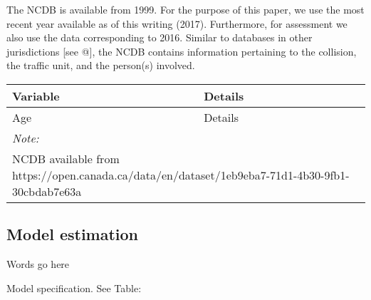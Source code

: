 \documentclass[]{elsarticle} %
\begin{document}
The NCDB is available from 1999. For the purpose of this paper, we use
the most recent year available as of this writing (2017). Furthermore,
for assessment we also use the data corresponding to 2016. Similar to
databases in other jurisdictions {[}see @{]}, the NCDB contains
information pertaining to the collision, the traffic unit, and the
person(s) involved.

\begin{tabular}{ll}
\toprule
Variable & Details\\
\midrule
Age & Details\\
\bottomrule
\multicolumn{2}{l}{\textit{Note: }}\\
\multicolumn{2}{l}{NCDB available from https://open.canada.ca/data/en/dataset/1eb9eba7-71d1-4b30-9fb1-30cbdab7e63a}\\
\end{tabular}

\hypertarget{model-estimation}{%
\subsection{Model estimation}\label{model-estimation}}

Words go here

Model specification. See Table:
\end{document}
